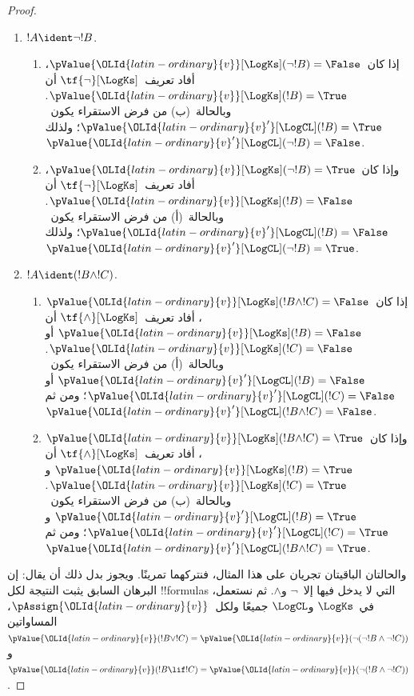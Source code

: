 \documentclass[../../../include/open-logic-section]{subfiles}
\begin{document}
\begin{proof}
\begin{enumerate}
    وأما خطوة الاستقراء فتفصل إلى الحالات الآتية:
    \item $!A \ident \lnot !B$.
    \begin{enumerate}
      \item إذا كان~$\pValue {\OLId{latin-ordinary}{v}}[\LogKs](\lnot!B) = \False$، أفاد
      تعريف~$\tf{\lnot}[\LogKs]$ أن
      $\pValue {\OLId{latin-ordinary}{v}}[\LogKs](!B) = \True$. وبالحالة~(ب) من فرض
      الاستقراء يكون~$\pValue {{\OLId{latin-ordinary}{v}}'}[\LogCL](!B) = \True$؛ ولذلك
      $\pValue {{\OLId{latin-ordinary}{v}}'}[\LogCL](\lnot !B) = \False$.
      \item وإذا كان~$\pValue {\OLId{latin-ordinary}{v}}[\LogKs](\lnot!B) = \True$، أفاد
      تعريف~$\tf{\lnot}[\LogKs]$ أن
      $\pValue {\OLId{latin-ordinary}{v}}[\LogKs](!B) = \False$. وبالحالة~(أ) من فرض
      الاستقراء يكون~$\pValue {{\OLId{latin-ordinary}{v}}'}[\LogCL](!B) = \False$؛ ولذلك
      $\pValue {{\OLId{latin-ordinary}{v}}'}[\LogCL](\lnot !B) = \True$.
    \end{enumerate}

    \item $!A \ident (!B \land !C)$.
    \begin{enumerate}
      \item إذا كان~$\pValue {\OLId{latin-ordinary}{v}}[\LogKs](!B \land !C) = \False$،
      أفاد تعريف~$\tf{\land}[\LogKs]$ أن
      $\pValue {\OLId{latin-ordinary}{v}}[\LogKs](!B) = \False$ أو
      $\pValue {\OLId{latin-ordinary}{v}}[\LogKs](!C) = \False$. وبالحالة~(أ) من فرض
      الاستقراء يكون~$\pValue {{\OLId{latin-ordinary}{v}}'}[\LogCL](!B) = \False$ أو
      $\pValue {{\OLId{latin-ordinary}{v}}'}[\LogCL](!C) = \False$؛ ومن ثم
      $\pValue {{\OLId{latin-ordinary}{v}}'}[\LogCL](!B \land !C) = \False$.
      \item وإذا كان~$\pValue {\OLId{latin-ordinary}{v}}[\LogKs](!B \land !C) = \True$،
      أفاد تعريف~$\tf{\land}[\LogKs]$ أن
      $\pValue {\OLId{latin-ordinary}{v}}[\LogKs](!B) = \True$ و
      $\pValue {\OLId{latin-ordinary}{v}}[\LogKs](!C) = \True$. وبالحالة~(ب) من فرض
      الاستقراء يكون~$\pValue {{\OLId{latin-ordinary}{v}}'}[\LogCL](!B) = \True$ و
      $\pValue {{\OLId{latin-ordinary}{v}}'}[\LogCL](!C) = \True$؛ ومن ثم
      $\pValue {{\OLId{latin-ordinary}{v}}'}[\LogCL](!B \land !C) = \True$.
    \end{enumerate}
  \end{enumerate}

  والحالتان الباقيتان تجريان على هذا المثال، فنتركهما تمرينًا.
  ويجوز بدل ذلك أن يقال: إن البرهان السابق يثبت النتيجة لكل
  !!{formula}s التي لا يدخل فيها إلا~$\lnot$ و$\land$. ثم نستعمل،
  في~$\LogKs$ و$\LogCL$ جميعًا ولكل~$\pAssign {\OLId{latin-ordinary}{v}}$، المساواتين
  $\pValue {\OLId{latin-ordinary}{v}}(!B \lor !C) = \pValue {\OLId{latin-ordinary}{v}}(\lnot(\lnot!B \land \lnot !C))$
  و$\pValue {\OLId{latin-ordinary}{v}}(!B \lif !C) = \pValue {\OLId{latin-ordinary}{v}}(\lnot(!B \land \lnot !C))$.
\end{proof}
\end{document}
